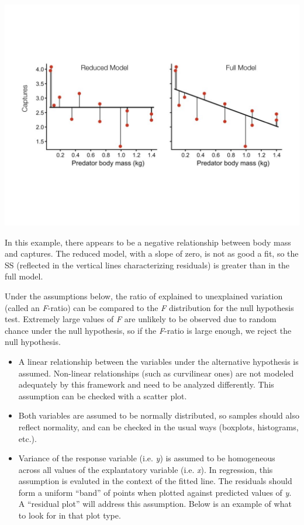 \documentclass[]{book}
\begin{document}
\begin{center}\includegraphics[width=14.22in]{images/images_4b.011} \end{center}

In this example, there appears to be a negative relationship between body mass and captures. The reduced model, with a slope of zero, is not as good a fit, so the SS (reflected in the vertical lines characterizing residuals) is greater than in the full model.

Under the assumptions below, the ratio of explained to unexplained variation (called an \emph{F}-ratio) can be compared to the \emph{F} distribution for the null hypothesis test. Extremely large values of \emph{F} are unlikely to be observed due to random chance under the null hypothesis, so if the \emph{F}-ratio is large enough, we reject the null hypothesis.

\begin{itemize}
\item
  A linear relationship between the variables under the alternative hypothesis is assumed. Non-linear relationships (such as curvilinear ones) are not modeled adequately by this framework and need to be analyzed differently. This assumption can be checked with a scatter plot.
\item
  Both variables are assumed to be normally distributed, so samples should also reflect normality, and can be checked in the usual ways (boxplots, histograms, etc.).
\item
  Variance of the response variable (i.e. \emph{y}) is assumed to be homogeneous across all values of the explantatory variable (i.e. \emph{x}). In regression, this assumption is evaluted in the context of the fitted line. The residuals should form a uniform ``band'' of points when plotted against predicted values of \emph{y}. A ``residual plot'' will address this assumption. Below is an example of what to look for in that plot type.
\end{itemize}
\end{document}
